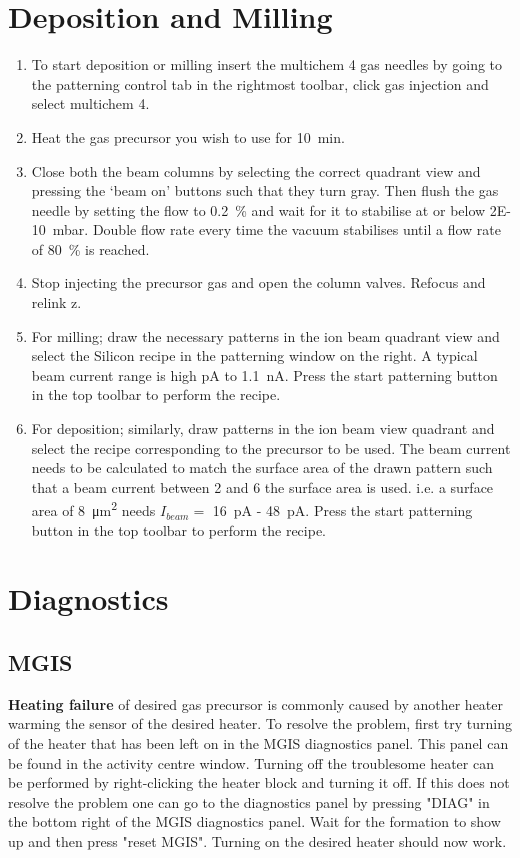 \documentclass[a4paper]{scrartcl}
\begin{document}
\section*{Deposition and Milling}
\begin{enumerate}
	\item To start deposition or milling insert the multichem 4 gas needles by going to the patterning control tab in the rightmost toolbar, click gas injection and select multichem 4.
	\item Heat the gas precursor you wish to use for \SI{10}{\minute}.
	\item Close both the beam columns by selecting the correct quadrant view and pressing the `beam on' buttons such that they turn gray. Then flush the gas needle by setting the flow to \SI{0.2}{\percent} and wait for it to stabilise at or below \SI{2E-10}{\milli \bar}. Double flow rate every time the vacuum stabilises until a flow rate of \SI{80}{\percent} is reached.
	\item Stop injecting the precursor gas and open the column valves. Refocus and relink z.
	\item For milling; draw the necessary patterns in the ion beam quadrant view and select the Silicon recipe in the patterning window on the right. A typical beam current range is high \si{\pico \ampere} to \SI{1.1}{\nano \ampere}. Press the start patterning button in the top toolbar to perform the recipe.
	\item For deposition; similarly, draw patterns in the ion beam view quadrant and select the recipe corresponding to the precursor to be used. The beam current needs to be calculated to match the surface area of the drawn pattern such that a beam current between \SI{2}{\times} and \SI{6}{\times} the surface area is used. i.e. a surface area of \SI{8}{\micro \meter \squared} needs $I_{beam}=$ \SI{16}{\pico \ampere} - \SI{48}{\pico \ampere}. Press the start patterning button in the top toolbar to perform the recipe.
\end{enumerate}

\section*{Diagnostics}
\subsection*{MGIS}
\textbf{Heating failure} of desired gas precursor is commonly caused by another heater warming the sensor of the desired heater. To resolve the problem, first try turning of the heater that has been left on in the MGIS diagnostics panel. This panel can be found in the activity centre window. Turning off the troublesome heater can be performed by right-clicking the heater block and turning it off. If this does not resolve the problem one can go to the diagnostics panel by pressing "DIAG" in the bottom right of the MGIS diagnostics panel. Wait for the formation to show up and then press "reset MGIS". Turning on the desired heater should now work.
\end{document}
